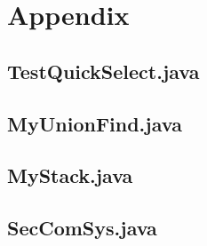 \documentclass[a5paper]{article}
\begin{document}
\section{Appendix}
\subsection{TestQuickSelect.java}

\subsection{MyUnionFind.java}

\subsection{MyStack.java}

\subsection{SecComSys.java}\label{sec:akka}

\end{document}
